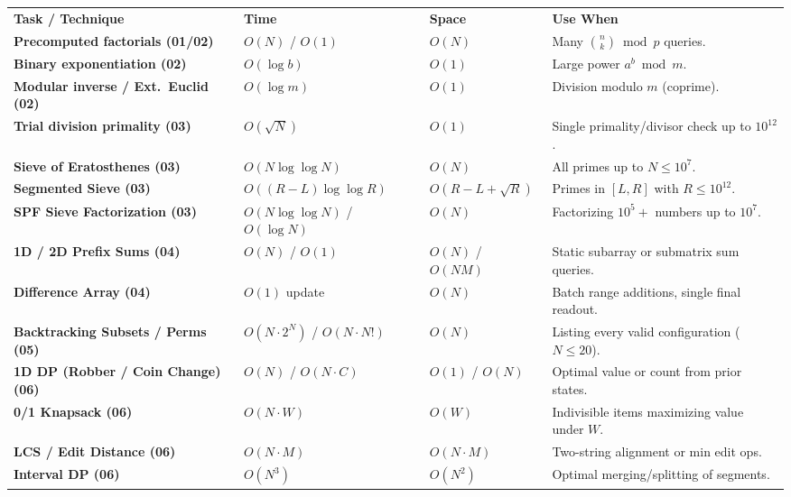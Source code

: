 \documentclass[11pt,a4paper]{article}
\begin{document}
\begingroup\footnotesize{}
\begin{xltabular}{\textwidth}{>{\raggedright\arraybackslash\bfseries}p{3.8cm} >{\centering\arraybackslash}p{2.6cm} >{\centering\arraybackslash}p{2.2cm} >{\raggedright\arraybackslash}X}
\toprule[1.2pt]
\textcolor{primaryblue}{\textbf{Task / Technique}} & \textcolor{primaryblue}{\textbf{Time}} & \textcolor{primaryblue}{\textbf{Space}} & \textcolor{primaryblue}{\textbf{Use When}} \\
\midrule[0.6pt]
\endhead
{}\bottomrule[1.2pt]
\endfoot
Precomputed factorials (01/02) & $O(N)$ / $O(1)$ & $O(N)$ & Many $\binom{n}{k} \bmod p$ queries. \\
Binary exponentiation (02) & $O(\log b)$ & $O(1)$ & Large power $a^b \bmod m$. \\
Modular inverse / Ext.\ Euclid (02) & $O(\log m)$ & $O(1)$ & Division modulo $m$ (coprime). \\
Trial division primality (03) & $O(\sqrt{N})$ & $O(1)$ & Single primality/divisor check up to $10^{12}$. \\
Sieve of Eratosthenes (03) & $O(N \log\log N)$ & $O(N)$ & All primes up to $N \le 10^7$. \\
Segmented Sieve (03) & $O((R{-}L)\log\log R)$ & $O(R{-}L+\sqrt{R})$ & Primes in $[L, R]$ with $R \le 10^{12}$. \\
SPF Sieve Factorization (03) & $O(N \log\log N)$ / $O(\log N)$ & $O(N)$ & Factorizing $10^5+$ numbers up to $10^7$. \\
1D / 2D Prefix Sums (04) & $O(N)$ / $O(1)$ & $O(N)$ / $O(NM)$ & Static subarray or submatrix sum queries. \\
Difference Array (04) & $O(1)$ update & $O(N)$ & Batch range additions, single final readout. \\
Backtracking Subsets / Perms (05) & $O(N \cdot 2^N)$ / $O(N \cdot N!)$ & $O(N)$ & Listing every valid configuration ($N \le 20$). \\
1D DP (Robber / Coin Change) (06) & $O(N)$ / $O(N \cdot C)$ & $O(1)$ / $O(N)$ & Optimal value or count from prior states. \\
0/1 Knapsack (06) & $O(N \cdot W)$ & $O(W)$ & Indivisible items maximizing value under $W$. \\
LCS / Edit Distance (06) & $O(N \cdot M)$ & $O(N \cdot M)$ & Two-string alignment or min edit ops. \\
Interval DP (06) & $O(N^3)$ & $O(N^2)$ & Optimal merging/splitting of segments. \\

\end{xltabular}
\end{document}
